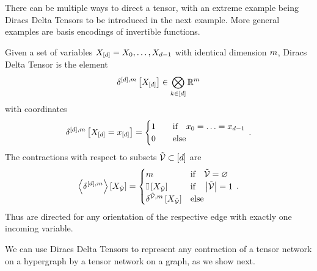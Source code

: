 There can be multiple ways to direct a tensor, with an extreme example being Diracs Delta Tensors to be introduced in the next example.
More general examples are basis encodings of invertible functions.

\begin{example}\label{exa:diracDeltaTensor}
    Given a set of variables $X_{[d]}=X_{0},\ldots,X_{d-1}$ with identical dimension $m$, Diracs Delta Tensor is the element
    \begin{align*}
        \delta^{[d],m}\left[X_{[d]}\right] \in \bigotimes_{k\in[d]} \mathbb{R}^{m}
    \end{align*}
    with coordinates
    \begin{align}
        \delta^{[d],m}\left[X_{[d]}=x_{[d]}\right] =
        \begin{cases}
            1 \quad & \text{if}\quad x_{0} = \ldots = x_{d-1} \\
            0 & \text{else}
        \end{cases} \, .
    \end{align}
    The contractions with respect to subsets $\tilde{\mathcal{V}}\subset[d]$ are
    \begin{align}
        \left\langle \delta^{[d],m}\right\rangle \left[ X_{\tilde{\mathcal{V}}} \right] =
        \begin{cases}
            m & \text{if}\quad \tilde{\mathcal{V}} = \varnothing \\
            \mathbb{I}\left[X_{\tilde{\mathcal{V}}}\right] & \text{if}\quad \left|\tilde{\mathcal{V}}\right| = 1\\
            \delta^{\tilde{\mathcal{V}},m}\left[X_{\tilde{\mathcal{V}}}\right] & \text{else}
        \end{cases} \, .
    \end{align}
    Thus are directed for any orientation of the respective edge with exactly one incoming variable.
\end{example}

We can use Diracs Delta Tensors to represent any contraction of a tensor network on a hypergraph by a tensor network on a graph, as we show next.

